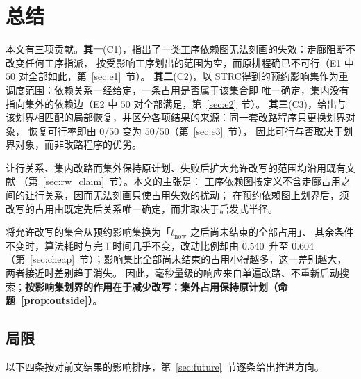 \documentclass[manuscript,screen,review]{acmart}
\providecommand{\STRC}{\textsc{STRC}}
\newcommand{\NPairs}{50}
\newcommand{\FeasRone}{0/\NPairs}            %
\newcommand{\FeasRtwo}{\NPairs/\NPairs}      %
\newcommand{\ResFracCheapRtwo}{0.540}
\newcommand{\ResFracAllFuture}{0.604}
\begin{document}
\section{总结}
\label{sec:conclusion}

本文有三项贡献。\textbf{其一}(C1)，指出了一类工序依赖图无法刻画的失效：走廊阻断不改变任何工序指派，
按受影响工序划出的范围为空，而原排程确已不可行（E1 中 \(\NPairs\) 对全部如此，第~\ref{sec:e1}~节）。
\textbf{其二}(C2)，以 \STRC 得到的预约影响集作为重调度范围：依赖关系一经给定，一条占用是否属于该集合即
唯一确定，集内没有指向集外的依赖边（E2 中 \(\NPairs\) 对全部满足，第~\ref{sec:e2}~节）。
\textbf{其三}(C3)，给出与该划界相匹配的局部恢复，并区分各项结果的来源：同一套改路程序只更换划界对象，
恢复可行率即由 \(\FeasRone\) 变为 \(\FeasRtwo\)（第~\ref{sec:e3}~节），
因此可行与否取决于划界对象，而非改路程序的优劣。

让行关系、集内改路而集外保持原计划、失败后扩大允许改写的范围均沿用既有文献
（第~\ref{sec:rw_claim}~节）。本文的主张是：
工序依赖图按定义不含走廊占用之间的让行关系，因而无法刻画只使占用失效的扰动；
在预约依赖图上划界后，须改写的占用由既定先后关系唯一确定，而非取决于启发式半径。

将允许改写的集合从预约影响集换为「\(t_{\mathrm{now}}\) 之后尚未结束的全部占用」、
其余条件不变时，算法耗时与完工时间几乎不变，改动比例却由 \ResFracCheapRtwo\ 升至
\ResFracAllFuture（第~\ref{sec:cheap}~节）；影响集比全部尚未结束的占用小得越多，这一差别越大，两者接近时差别趋于消失。
因此，毫秒量级的响应来自单遍改路、不重新启动搜索；\textbf{按影响集划界的作用在于减少改写：集外占用保持原计划（命题~\ref{prop:outside}）}。

\subsection{局限}
\label{sec:limitations}

以下四条按对前文结果的影响排序，第~\ref{sec:future}~节逐条给出推进方向。
\end{document}
